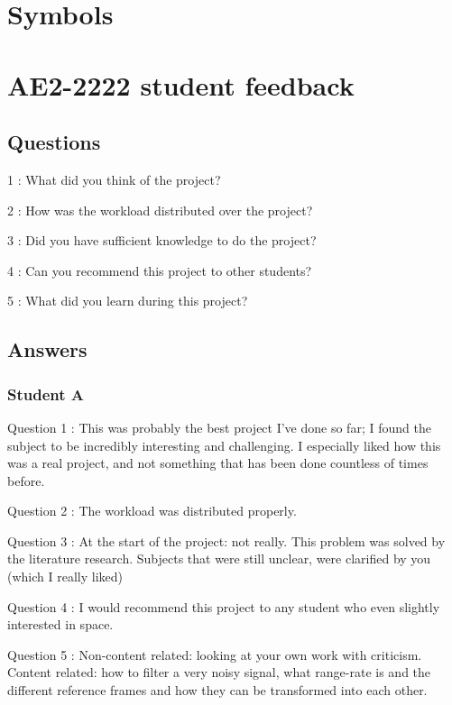 \documentclass[11pt,a4paper,oneside]{article}
\newcommand{\listskip}{0pt}
\newenvironment{description*}
{\begin{description}
  \setlength{\itemsep}{\listskip}
  \setlength{\parskip}{\listskip}
  \setlength{\parsep}{\listskip}}
{\end{description}}
\begin{document}
\ifdefined\UseSymbols
  \ifdefined\IncludeAcronymList
    \newpage
    \section*{Symbols}
  \fi
  
\fi




\appendix

\newpage
\section{AE2-2222 student feedback} \label{sec:appendixA}

\subsection{Questions}

\begin{description*}
\item[1]: What did you think of the project?
\item[2]: How was the workload distributed over the project?
\item[3]: Did you have sufficient knowledge to do the project?
\item[4]: Can you recommend this project to other students?
\item[5]: What did you learn during this project?
\end{description*}

\subsection{Answers}


\subsubsection{Student A}

\begin{description*}
\item[Question 1]: This was probably the best project I've done so far; I found the subject to be incredibly interesting and challenging. I especially liked how this was a real project, and not something that has been done countless of times before.
\item[Question 2]: The workload was distributed properly.
\item[Question 3]: At the start of the project: not really. This problem was solved by the literature research. Subjects that were still unclear, were clarified by you (which I really liked)
\item[Question 4]: I would recommend this project to any student who even slightly interested in space.
\item[Question 5]: Non-content related: looking at your own work with criticism. Content related: how to filter a very noisy signal, what range-rate is and the different reference frames and how they can be transformed into each other.
\end{description*}
\end{document}
